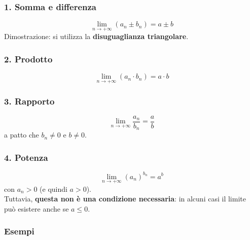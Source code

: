 \subsubsection{1. Somma e differenza}
\[
\lim_{n \to +\infty} (a_n \pm b_n) = a \pm b
\]
Dimostrazione: si utilizza la \textbf{disuguaglianza triangolare}.


\subsubsection{2. Prodotto}\label{prodotto}
\[
   \lim_{n \to +\infty} (a_n \cdot b_n) = a \cdot b
\]

\subsubsection{3. Rapporto}\label{rapporto}
\[
   \lim_{n \to +\infty} \frac{a_n}{b_n} = \frac{a}{b}
\]
a patto che \(b_n \neq 0\) e \(b \neq 0\).

\subsubsection{4. Potenza}\label{potenza}
\[
   \lim_{n \to +\infty} (a_n)^{b_n} = a^{b}
\]
con \(a_n > 0\) (e quindi \(a > 0\)).\\
Tuttavia, \textbf{questa non è una condizione necessaria}: in alcuni
casi il limite può esistere anche se \(a \le 0\).
\subsubsection{Esempi}\label{esempi}

